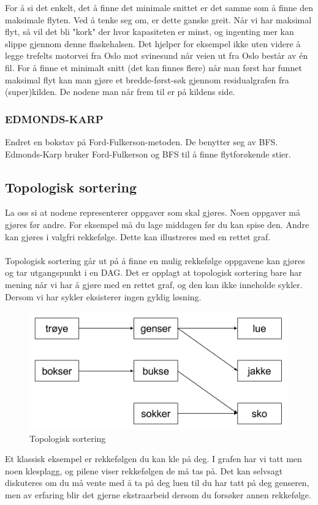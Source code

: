 \noindent For å si det enkelt, det å finne det minimale snittet er det samme som å finne den maksimale flyten. Ved å tenke seg om, er dette ganske greit. Når vi har maksimal flyt, så vil det bli "kork" der hvor kapasiteten er minst, og ingenting mer kan slippe gjennom denne flaskehalsen. Det hjelper for eksempel ikke uten videre å legge trefelts motorvei fra Oslo mot svinesund når veien ut fra Oslo består av én fil. For å finne et minimalt snitt (det kan finnes flere) når man først har funnet maksimal flyt kan man gjøre et bredde-først-søk gjennom residualgrafen fra (super)kilden. De nodene man når frem til er på kildens side.

\subsubsection{EDMONDS-KARP}
Endret en bokstav på Ford-Fulkerson-metoden. De benytter seg av BFS. Edmonds-Karp bruker Ford-Fulkerson og BFS til å finne flytforøkende stier.\\

\subsection{Topologisk sortering}
La oss si at nodene representerer oppgaver som skal gjøres. Noen oppgaver må gjøres før andre. For eksempel må du lage middagen før du kan spise den. Andre kan gjøres i valgfri rekkefølge. Dette kan illustreres med en rettet graf.
\\\\
Topologisk sortering går ut på å finne en mulig rekkefølge oppgavene kan gjøres og tar utgangspunkt i en DAG. Det er opplagt at topologisk sortering bare har mening når vi har å gjøre med en rettet graf, og den kan ikke inneholde sykler. Dersom vi har sykler eksisterer ingen gyldig løsning.

\begin{boxed}
\begin{figure}[H]
\includegraphics[scale=0.7]{images/topologisk}
\centering %
\caption{Topologisk sortering}
\label{fig:topologisk}
\end{figure}

Et klassisk eksempel er rekkefølgen du kan kle på deg. I grafen har vi tatt men noen klesplagg, og pilene viser rekkefølgen de må tas på. Det kan selvsagt diskuteres om du må vente med å ta på deg luen til du har tatt på deg genseren, men av erfaring blir det gjerne ekstraarbeid dersom du forsøker annen rekkefølge.
\end{boxed}

